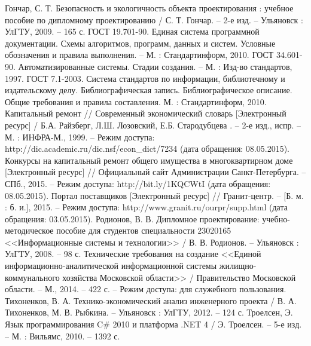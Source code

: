 \renewcommand{\refname}{Список использованных источников}

\begin{thebibliography}{99}
	
	 Гончар, С. Т. Безопасность и экологичность объекта проектирования : учебное пособие по дипломному проектированию / С. Т. Гончар. – 2-е изд. – Ульяновск : УлГТУ, 2009. – 165 с.
	 ГОСТ 19.701-90. Единая система программной документации. Схемы алгоритмов, программ, данных и систем. Условные обозначения и правила выполнения. – М. : Стандартинформ, 2010.
	 ГОСТ 34.601-90. Автоматизированные системы. Стадии создания. – М. : Изд-во стандартов, 1997.
	 ГОСТ 7.1-2003. Система стандартов по информации, библиотечному и издательскому делу. Библиографическая запись. Библиографическое описание. Общие требования и правила составления.  М. : Стандартинформ, 2010.
	 Капитальный ремонт // Современный экономический словарь [Электронный ресурс] / Б.А. Райзберг, Л.Ш. Лозовский, Е.Б. Стародубцева . – 2-е изд., испр. – М. : ИНФРА-М., 1999. – Режим доступа: http://dic.academic.ru/dic.nsf/econ\_dict/7234 (дата обращения: 08.05.2015).
	 Конкурсы на капитальный ремонт общего имущества в многоквартирном доме [Электронный ресурс] // Официальный сайт Администрации Санкт-Петербурга. – СПб., 2015. – Режим доступа: http://bit.ly/1KQCWtI (дата обращения: 08.05.2015).
	 Портал поставщиков [Электронный ресурс] // Гранит-центр. – [Б. м. : б. и.], 2015. – Режим доступа: http://www.granit.ru/ourpr/supp.html (дата обращения: 03.05.2015).
	 Родионов, В. В. Дипломное проектирование: учебно-методическое пособие для студентов специальности 23020165 <<Информационные системы и технологии>> / В. В. Родионов. – Ульяновск : УлГТУ, 2008. – 98 с.
	 Технические требования на создание <<Единой информационно-аналитической информационной системы жилищно-коммунального хозяйства Московской области>> / Правительство Московской области. – М., 2014. – 422 с. – Режим доступа: для служебного пользования.
	 Тихоненков, В. А. Технико-экономический анализ инженерного проекта / В. А. Тихоненков, М. В. Рыбкина. – Ульяновск : УлГТУ, 2012. – 124 с.
	 Троелсен, Э. Язык программирования C\# 2010 и платформа .NET 4 / Э. Троелсен. – 5-е изд. – М. : Вильямс, 2010. – 1392 с.

\end{thebibliography}
